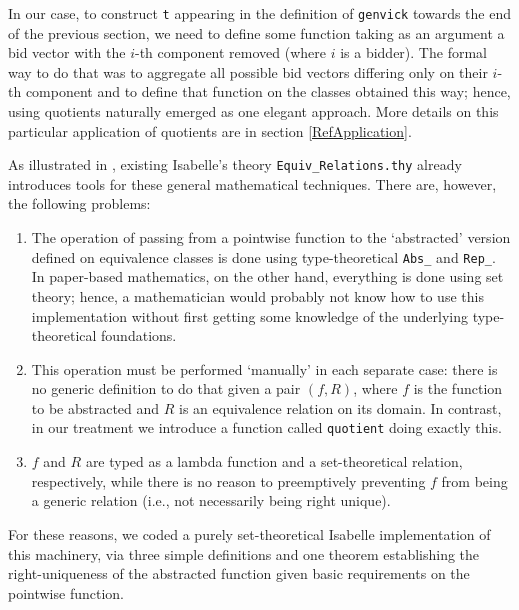 \documentclass[
]{llncs}
\newcommand{\I}{Isabelle}
\begin{document}
In our case, to construct \verb|t| 
appearing in the definition of \verb|genvick| towards the end of the previous section, 
we need to define some function taking as an argument a bid vector with the $i$-th component removed (where $i$ is a bidder).
The formal way to do that was to aggregate all possible bid vectors differing only on their $i$-th component and to define that function on the classes obtained this way; hence, using quotients naturally emerged as one elegant approach.
More details on this particular application of quotients are in section \ref{RefApplication}.

As illustrated in \cite{paulson2006defining}, existing \I{}'s theory \verb|Equiv_Relations.thy| already introduces tools for these general mathematical techniques.
There are, however, the following problems:
\begin{enumerate}
\item
The operation of passing from a pointwise function to the `abstracted{}' version defined on equivalence classes is done using type-theoretical \verb|Abs_| and \verb|Rep_|.
In paper-based mathematics, on the other hand, everything is done using set theory; hence, a mathematician would probably not know how to use this implementation without first getting some knowledge of the underlying type-theoretical foundations.
\item
This operation must be performed `manually{}' in each separate case: there is no generic definition to do that given a pair $\left( f, R \right)$, where $f$ is the function to be abstracted and $R$ is an equivalence relation on its domain.
In contrast, in our treatment we introduce a function called \verb|quotient| doing exactly this.
\item
$f$ and $R$ are typed as a lambda function and a set-theoretical relation, respectively, while there is no reason to preemptively preventing $f$ from being a generic relation (i.e., not necessarily being right unique).
\end{enumerate}



For these reasons, we coded a purely set-theoretical \I{} implementation of this machinery, via three simple definitions and one theorem establishing the right-uniqueness of the abstracted function given basic requirements on the pointwise function.
\end{document}
